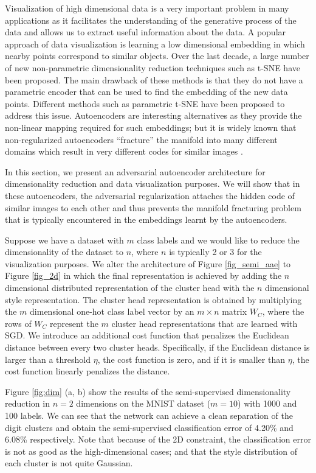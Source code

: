 \documentclass{article}
\begin{document}
Visualization of high dimensional data is a very important problem in many applications as it facilitates the understanding of the generative process of the data and allows us to extract useful information about the data. A popular approach of data visualization is learning a low dimensional embedding in which nearby points correspond to similar objects. Over the last decade, a large number of new non-parametric dimensionality reduction techniques such as t-SNE \citep{tsne} have been proposed. The main drawback of these methods is that they do not have a parametric encoder that can be used to find the embedding of the new data points. Different methods such as parametric t-SNE \citep{param_tsne} have been proposed to address this issue. Autoencoders are interesting alternatives as they provide the non-linear mapping required for such embeddings; but it is widely known that non-regularized autoencoders ``fracture'' the manifold into many different domains which result in very different codes for similar images \citep{geoff_dim_reduce}.

In this section, we present an adversarial autoencoder architecture for dimensionality reduction and data visualization purposes. We will show that in these autoencoders, the adversarial regularization attaches the hidden code of similar images to each other and thus prevents the manifold fracturing problem that is typically encountered in the embeddings learnt by the autoencoders. 

Suppose we have a dataset with $m$ class labels and we would like to reduce the dimensionality of the dataset to $n$, where $n$ is typically 2 or 3 for the visualization purposes. 
We alter the architecture of Figure \ref{fig_semi_aae} to Figure \ref{fig_2d} in which the final representation is achieved by adding the $n$ dimensional distributed representation of the cluster head with the $n$ dimensional style representation. The cluster head representation is obtained by multiplying the $m$ dimensional one-hot class label vector by an $m \times n$ matrix $W_C$, where the rows of $W_C$ represent the $m$ cluster head representations that are learned with SGD. We introduce an additional cost function that penalizes the Euclidean distance between every two cluster heads. Specifically, if the Euclidean distance is larger than a threshold $\eta$, the cost function is zero, and if it is smaller than $\eta$, the cost function linearly penalizes the distance.

Figure \ref{fig:dim} (a, b) show the results of the semi-supervised dimensionality reduction in $n=2$ dimensions on the MNIST dataset ($m=10$) with 1000 and 100 labels. We can see that the network can achieve a clean separation of the digit clusters and obtain the semi-supervised classification error of 4.20\% and 6.08\% respectively. Note that because of the 2D constraint, the classification error is not as good as the high-dimensional cases; and that the style distribution of each cluster is not quite Gaussian. 
\end{document}
